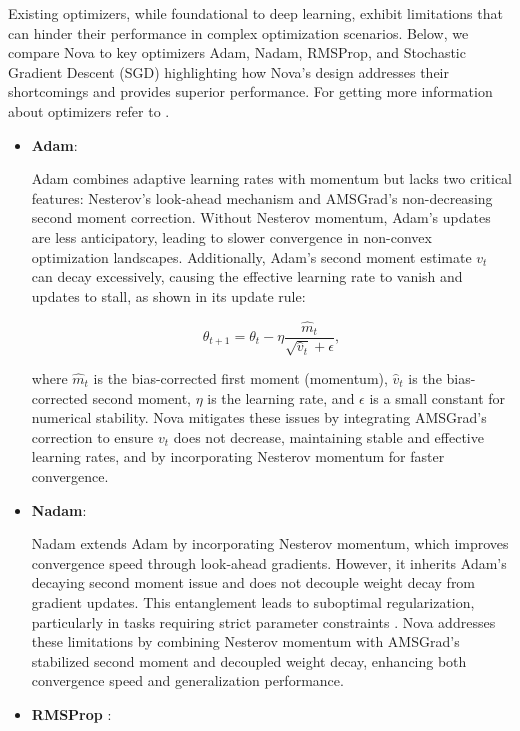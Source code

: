 \documentclass{article}
\begin{document}
Existing optimizers, while foundational to deep learning, exhibit limitations that can hinder their performance in complex optimization scenarios. Below, we compare Nova to key optimizers Adam, Nadam, RMSProp, and Stochastic Gradient Descent (SGD) highlighting how Nova’s design addresses their shortcomings and provides superior performance. For getting more information about optimizers refer to \cite{A1, A2, A3, A4, A6}.

\begin{itemize}



\item \textbf{Adam}\cite{kingma2014adam}: 

Adam combines adaptive learning rates with momentum but lacks two critical features: Nesterov’s look-ahead mechanism and AMSGrad’s non-decreasing second moment correction. Without Nesterov momentum, Adam’s updates are less anticipatory, leading to slower convergence in non-convex optimization landscapes. Additionally, Adam’s second moment estimate $v_t$ can decay excessively, causing the effective learning rate to vanish and updates to stall, as shown in its update rule:


\[
\theta_{t+1} = \theta_t - \eta \frac{\hat{m}_t}{\sqrt{\hat{v}_t} + \epsilon},
\]


where $\hat{m}_t$ is the bias-corrected first moment (momentum), $\hat{v}_t$ is the bias-corrected second moment, $\eta$ is the learning rate, and $\epsilon$ is a small constant for numerical stability. Nova mitigates these issues by integrating AMSGrad’s correction \cite{Reddi2018} to ensure $v_t$ does not decrease, maintaining stable and effective learning rates, and by incorporating Nesterov momentum for faster convergence.

\item \textbf{Nadam}\cite{Dozat2016}:

 Nadam extends Adam by incorporating Nesterov momentum, which improves convergence speed through look-ahead gradients. However, it inherits Adam’s decaying second moment issue and does not decouple weight decay from gradient updates. This entanglement leads to suboptimal regularization, particularly in tasks requiring strict parameter constraints \cite{Loshchilov2017}. Nova addresses these limitations by combining Nesterov momentum with AMSGrad’s stabilized second moment and decoupled weight decay, enhancing both convergence speed and generalization performance.

\item \textbf{RMSProp} \cite{Tieleman2012}:


\end{itemize}
\end{document}
